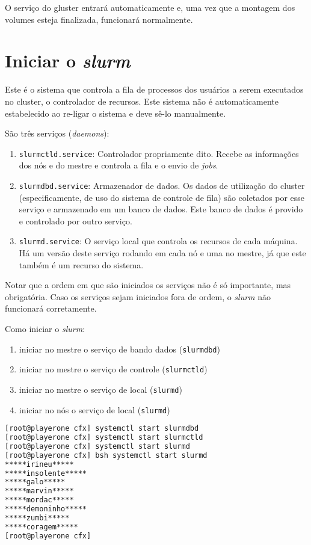 O serviço do gluster entrará automaticamente e, uma vez que a montagem dos volumes esteja finalizada, funcionará normalmente. 

\section{Iniciar o \textit{slurm}}

Este é o sistema que controla a fila de processos dos usuários a serem executados no cluster, o controlador de
recursos. Este sistema não é automaticamente estabelecido ao re-ligar o sistema e deve sê-lo manualmente.

São três serviços (\textit{daemons}):

\begin{enumerate}
\item \texttt{slurmctld.service}: Controlador propriamente dito. Recebe as informações dos nós e do mestre e controla
  a fila e o envio de \textit{jobs}.
  \item \texttt{slurmdbd.service}: Armazenador de dados. Os dados de utilização do cluster (especificamente, de uso do sistema de controle de fila) são coletados por esse serviço e armazenado em um banco de dados. Este banco de dados é provido e controlado por outro serviço.
  \item \texttt{slurmd.service}: O serviço local que controla os recursos de cada máquina. Há um versão deste serviço rodando em cada nó e uma no mestre, já que este também é um recurso do sistema.
\end{enumerate}

Notar que a ordem em que são iniciados os serviços não é só importante, mas obrigatória. Caso os serviços
sejam iniciados fora de ordem, o \textit{slurm} não funcionará corretamente.

Como iniciar o \textit{slurm}: %

\begin{enumerate}
\item iniciar no mestre o serviço de bando dados (\texttt{slurmdbd})
\item iniciar no mestre o serviço de controle (\texttt{slurmctld})
\item iniciar no mestre o serviço de local (\texttt{slurmd})
\item iniciar no nós o serviço de local (\texttt{slurmd})
\end{enumerate}

\begin{lstlisting}[language=bash,basicstyle=\small]
[root@playerone cfx] systemctl start slurmdbd
[root@playerone cfx] systemctl start slurmctld
[root@playerone cfx] systemctl start slurmd
[root@playerone cfx] bsh systemctl start slurmd
*****irineu*****
*****insolente*****
*****galo*****
*****marvin*****
*****mordac*****
*****demoninho*****
*****zumbi*****
*****coragem*****
[root@playerone cfx]
\end{lstlisting}

